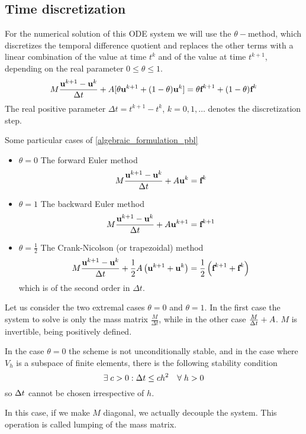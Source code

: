 \subsection{Time discretization}
For the numerical solution of this ODE system we will use the \(\theta-\)method, which discretizes the temporal difference quotient and replaces the other terms with a linear combination of the value at time \(t^k\) and of the value at time \(t^{k+1}\), depending on the real parameter \(0 \leq \theta \leq 1\).
\begin{equation}
    M\frac{\textbf{u}^{k+1} - \textbf{u}^k}{\Delta t} + A[\theta \textbf{u}^{k+1} + (1-\theta)\textbf{u}^k] = \theta \textbf{f}^{k+1} + (1-\theta)\textbf{f}^k
    \label{theta_method_pbl}
\end{equation}
The real positive parameter \(\Delta t = t^{k+1}-t^k\), \(k=0,1,\ldots\) denotes the discretization step.

Some particular cases of \eqref{algebraic_formulation_pbl} 
\begin{itemize}
    \item \(\theta = 0\) The forward Euler method 
    \[
        M\frac{\textbf{u}^{k+1}-\textbf{u}^k}{\Delta t} + A\textbf{u}^{k} = \textbf{f}^k
    \]
    \item \(\theta = 1\) The backward Euler method 
    \[
        M\frac{\textbf{u}^{k+1}-\textbf{u}^k}{\Delta t} + A\textbf{u}^{k+1} = \textbf{f}^{k+1}        
    \]
    \item \(\theta = \frac{1}{2}\) The Crank-Nicolson (or trapezoidal) method
    \[
        M\frac{\textbf{u}^{k+1}-\textbf{u}^k}{\Delta t} + \frac{1}{2}A\left( \textbf{u}^{k+1} + \textbf{u}^k \right) = \frac{1}{2}\left( \textbf{f}^{k+1} + \textbf{f}^k \right)
    \]
    which is of the second order in \(\Delta t\). 
\end{itemize}
Let us consider the two extremal cases \(\theta = 0\) and \(\theta = 1\). In the first case the system to solve is only the mass matrix \(\frac{M}{\Delta t}\), while in the other case \(\frac{M}{\Delta t} + A\). \(M\) is invertible, being positively defined.

In the case \(\theta = 0\) the scheme is not unconditionally stable, and in the case where \(V_h\) is a subspace of finite elements, there is the following stability condition 
\[
    \exists \; c > 0 : \Delta t \leq ch^2 \quad \forall \; h > 0
\]
so \(\Delta t\) cannot be chosen irrespective of \(h\).

In this case, if we make \(M\) diagonal, we actually decouple the system. This operation is called lumping of the mass matrix.

